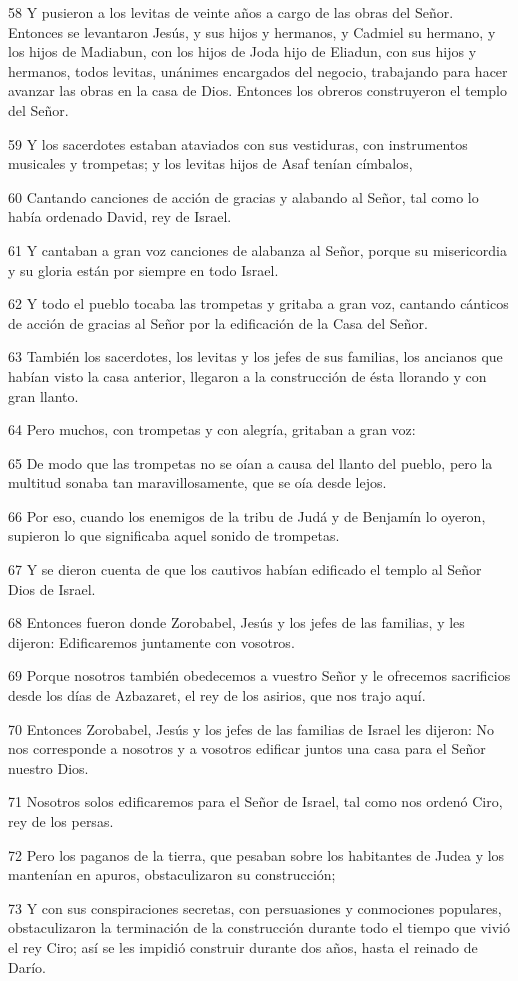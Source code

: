 \par 58 Y pusieron a los levitas de veinte años a cargo de las obras del Señor. Entonces se levantaron Jesús, y sus hijos y hermanos, y Cadmiel su hermano, y los hijos de Madiabun, con los hijos de Joda hijo de Eliadun, con sus hijos y hermanos, todos levitas, unánimes encargados del negocio, trabajando para hacer avanzar las obras en la casa de Dios. Entonces los obreros construyeron el templo del Señor.
\par 59 Y los sacerdotes estaban ataviados con sus vestiduras, con instrumentos musicales y trompetas; y los levitas hijos de Asaf tenían címbalos,
\par 60 Cantando canciones de acción de gracias y alabando al Señor, tal como lo había ordenado David, rey de Israel.
\par 61 Y cantaban a gran voz canciones de alabanza al Señor, porque su misericordia y su gloria están por siempre en todo Israel.
\par 62 Y todo el pueblo tocaba las trompetas y gritaba a gran voz, cantando cánticos de acción de gracias al Señor por la edificación de la Casa del Señor.
\par 63 También los sacerdotes, los levitas y los jefes de sus familias, los ancianos que habían visto la casa anterior, llegaron a la construcción de ésta llorando y con gran llanto.
\par 64 Pero muchos, con trompetas y con alegría, gritaban a gran voz:
\par 65 De modo que las trompetas no se oían a causa del llanto del pueblo, pero la multitud sonaba tan maravillosamente, que se oía desde lejos.
\par 66 Por eso, cuando los enemigos de la tribu de Judá y de Benjamín lo oyeron, supieron lo que significaba aquel sonido de trompetas.
\par 67 Y se dieron cuenta de que los cautivos habían edificado el templo al Señor Dios de Israel.
\par 68 Entonces fueron donde Zorobabel, Jesús y los jefes de las familias, y les dijeron: Edificaremos juntamente con vosotros.
\par 69 Porque nosotros también obedecemos a vuestro Señor y le ofrecemos sacrificios desde los días de Azbazaret, el rey de los asirios, que nos trajo aquí.
\par 70 Entonces Zorobabel, Jesús y los jefes de las familias de Israel les dijeron: No nos corresponde a nosotros y a vosotros edificar juntos una casa para el Señor nuestro Dios.
\par 71 Nosotros solos edificaremos para el Señor de Israel, tal como nos ordenó Ciro, rey de los persas.
\par 72 Pero los paganos de la tierra, que pesaban sobre los habitantes de Judea y los mantenían en apuros, obstaculizaron su construcción;
\par 73 Y con sus conspiraciones secretas, con persuasiones y conmociones populares, obstaculizaron la terminación de la construcción durante todo el tiempo que vivió el rey Ciro; así se les impidió construir durante dos años, hasta el reinado de Darío.

